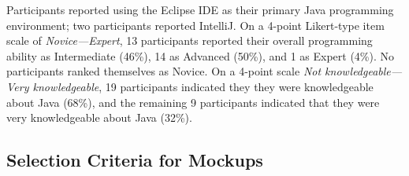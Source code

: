 \documentclass[conference]{IEEEtran}
\begin{document}
Participants reported using the Eclipse IDE as their primary Java programming environment; two participants reported IntelliJ. On a 4-point Likert-type item scale of \emph{Novice---Expert}, 13 participants reported their overall programming ability as Intermediate (46\%), 14 as Advanced (50\%), and 1 as Expert (4\%). No participants ranked themselves as Novice. On a 4-point scale \emph{Not knowledgeable---Very knowledgeable}, 19 participants indicated they they were knowledgeable about Java (68\%), and the remaining 9 participants indicated that they were very knowledgeable about Java (32\%).





\subsection{Selection Criteria for Mockups}
\end{document}
